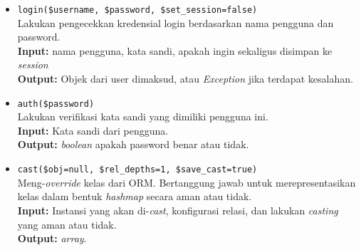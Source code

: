 \begin{itemize}
\begin{itemize}
                \item \texttt{login(\$username, \$password,
                \$set\_session=false)} \\
                    Lakukan pengecekkan kredensial login berdasarkan nama
                    pengguna dan password. \\
                    \textbf{Input:} nama pengguna, kata sandi, apakah ingin
                        sekaligus disimpan ke \textit{session}\\
                    \textbf{Output:} Objek dari user dimaksud, atau
                        \textit{Exception} jika terdapat kesalahan.
                
                \item \texttt{auth(\$password)} \\
                    Lakukan verifikasi kata sandi yang dimiliki pengguna ini. \\
                    \textbf{Input:} Kata sandi dari pengguna.\\
                    \textbf{Output:} \textit{boolean} apakah password benar atau
                    tidak.
                
                \item \texttt{cast(\$obj=null, \$rel\_depths=1,
                \$save\_cast=true)} \\
                    Meng-\textit{override} kelas dari ORM. Bertanggung jawab
                    untuk merepresentasikan kelas dalam bentuk \textit{hashmap}
                    secara aman atau tidak. \\
                    \textbf{Input:} Instansi yang akan di-\textit{cast},
                        konfigurasi relasi, dan lakukan \textit{casting} yang
                        aman atau tidak.\\
                    \textbf{Output:} \textit{array}.

            \end{itemize}
            

\end{itemize}
